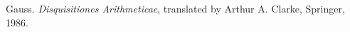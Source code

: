 \documentclass[twoside,twocolumn]{article}
\theoremstyle{definition}
\theoremstyle{remark}
\begin{document}


\begin{thebibliography}{99} %

Gauss. \emph{Disquisitiones Arithmeticae}, translated by Arthur A. Clarke, Springer, 1986.

\end{thebibliography}

\end{document}
